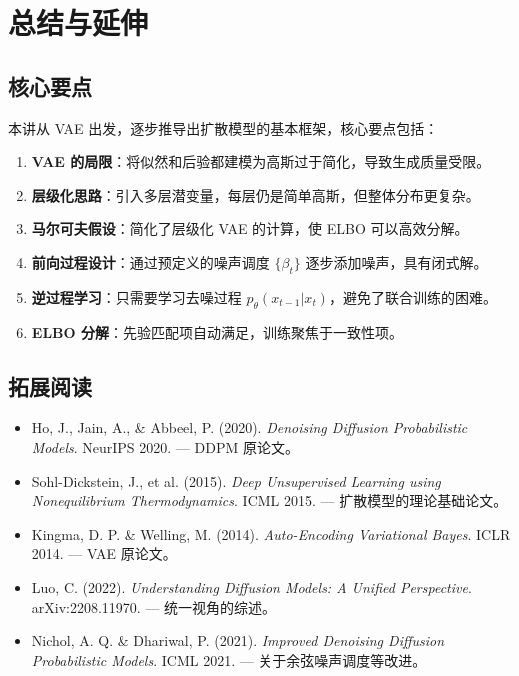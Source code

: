 \section{总结与延伸}

\subsection{核心要点}

本讲从 VAE 出发，逐步推导出扩散模型的基本框架，核心要点包括：

\begin{enumerate}
    \item \textbf{VAE 的局限}：将似然和后验都建模为高斯过于简化，导致生成质量受限。
    \item \textbf{层级化思路}：引入多层潜变量，每层仍是简单高斯，但整体分布更复杂。
    \item \textbf{马尔可夫假设}：简化了层级化 VAE 的计算，使 ELBO 可以高效分解。
    \item \textbf{前向过程设计}：通过预定义的噪声调度 $\{\beta_t\}$ 逐步添加噪声，具有闭式解。
    \item \textbf{逆过程学习}：只需要学习去噪过程 $p_\theta(x_{t-1}|x_t)$，避免了联合训练的困难。
    \item \textbf{ELBO 分解}：先验匹配项自动满足，训练聚焦于一致性项。
\end{enumerate}

\subsection{拓展阅读}

\begin{itemize}
    \item Ho, J., Jain, A., \& Abbeel, P. (2020). \textit{Denoising Diffusion Probabilistic Models}. NeurIPS 2020. --- DDPM 原论文。
    \item Sohl-Dickstein, J., et al. (2015). \textit{Deep Unsupervised Learning using Nonequilibrium Thermodynamics}. ICML 2015. --- 扩散模型的理论基础论文。
    \item Kingma, D. P. \& Welling, M. (2014). \textit{Auto-Encoding Variational Bayes}. ICLR 2014. --- VAE 原论文。
    \item Luo, C. (2022). \textit{Understanding Diffusion Models: A Unified Perspective}. arXiv:2208.11970. --- 统一视角的综述。
    \item Nichol, A. Q. \& Dhariwal, P. (2021). \textit{Improved Denoising Diffusion Probabilistic Models}. ICML 2021. --- 关于余弦噪声调度等改进。
\end{itemize}



